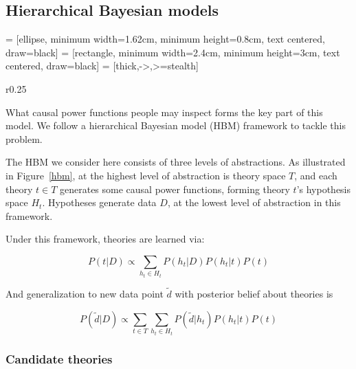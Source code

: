 \documentclass{article}
\begin{document}
\subsection*{Hierarchical Bayesian models}

 = [ellipse, minimum width=1.62cm, minimum height=0.8cm, text centered, draw=black]
 = [rectangle, minimum width=2.4cm, minimum height=3cm, text centered, draw=black]
 = [thick,->,>=stealth]
\begin{wrapfigure}{r}{0.25\textwidth}
\begin{center}
	\caption{A HBM.}
	\label{hbm}
\end{center}
\end{wrapfigure}

What causal power functions people may inspect forms the key part of this model. We follow a hierarchical Bayesian model (HBM) framework to tackle this problem.

The HBM we consider here consists of three levels of abstractions. As illustrated in Figure~\ref{hbm}, at the highest level of abstraction is theory space $T$, and each theory $t \in T$ generates some causal power functions, forming theory $t$'s hypothesis space $H_t$. Hypotheses generate data $D$, at the lowest level of abstraction in this framework.

Under this framework, theories are learned via:

\begin{equation}
P(t|D) \propto \sum_{h_t \in H_t}P(h_t|D)P(h_t|t)P(t)
\end{equation}

And generalization to new data point $\tilde{d}$ with posterior belief about theories is

\begin{equation}
P(\tilde{d}|D) \propto \sum_{t \in T}\sum_{h_t \in H_t}P(\tilde{d}|h_t)P(h_t|t)P(t)
\end{equation}



\subsubsection*{Candidate theories}
\end{document}
